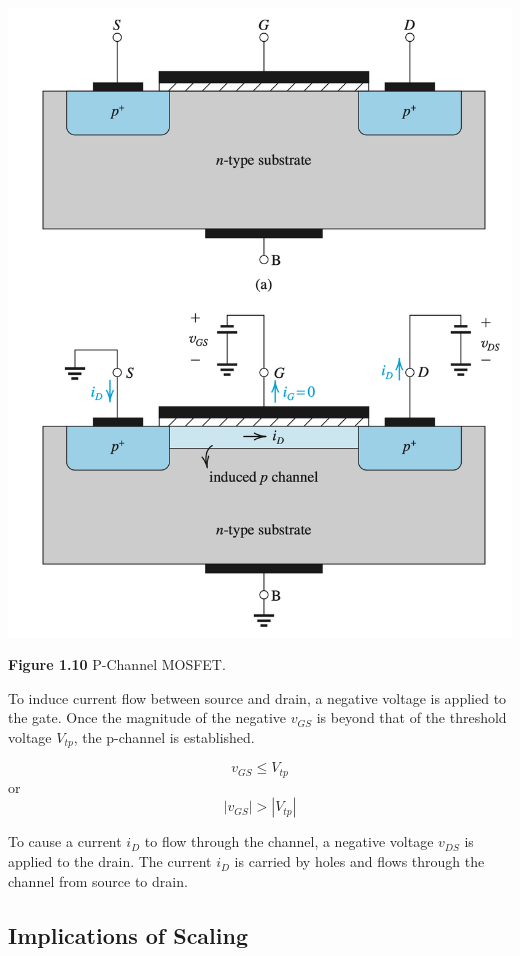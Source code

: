 \documentclass[12pt]{article}
\begin{document}
    \begin{center}
        \centerline{\includegraphics[scale=0.5]{figures/fig13.png}}
        \textbf{Figure 1.10} P-Channel MOSFET.
    \end{center}
    
    To induce current flow between source and drain, a negative voltage is applied to the gate. Once
    the magnitude of the negative $v_{GS}$ is beyond that of the threshold voltage $V_{tp}$, the 
    p-channel is established.

    $$v_{GS} \leq V_{tp}$$
    or
    $$|v_{GS}| > |V_{tp}|$$

    To cause a current $i_D$ to flow through the channel, a negative voltage $v_{DS}$ is applied to 
    the drain. The current $i_D$ is carried by holes and flows through the channel from source to drain.

    \subsection*{Implications of Scaling}
\end{document}
